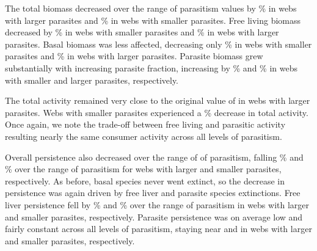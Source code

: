 \documentclass[/home/nkappler/Research/Dissertation/dissertation.tex]{subfiles}
\begin{document}
\begin{bibunit}
The total biomass decreased over the range of parasitism values by
\% in webs with larger
parasites and \% in webs
with smaller parasites. Free living biomass decreased by
\% in webs with smaller
parasites and \% in webs
with larger parasites. Basal biomass was less affected, decreasing only
\% in webs with smaller
parasites and \% in webs
with larger parasites. Parasite biomass grew substantially with increasing
parasite fraction, increasing by
\% and
\% in webs with smaller and
larger parasites, respectively.

The total activity remained very close to the original value of
 in webs with larger
parasites. Webs with smaller parasites experienced a
\% decrease in total
activity. Once again, we note the trade-off between free living and parasitic
activity resulting nearly the same consumer activity across all levels of
parasitism.

Overall persistence also decreased over the range of of parasitism, falling
\% and
\% over the range of
parasitism for webs with larger and smaller parasites, respectively. As before,
basal species never went extinct, so the decrease in persistence was again
driven by free liver and parasite species extinctions. Free liver persistence
fell by \% and
\% over the range of
parasitism in webs with larger and smaller parasites, respectively. Parasite
persistence was on average low and fairly constant across all levels of
parasitism, staying near 
and  in webs with larger
and smaller parasites, respectively.


\end{bibunit}
\end{document}
